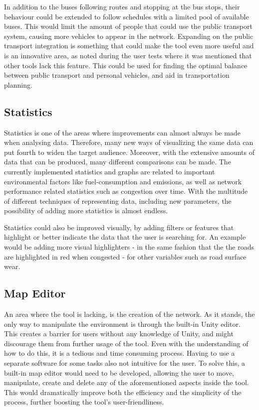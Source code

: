         In addition to the buses following routes and stopping at the bus stops, their behaviour could be extended to follow schedules with a limited pool of available buses. This would limit the amount of people that could use the public transport system, causing more vehicles to appear in the network. Expanding on the public transport integration is something that could make the tool even more useful and is an innovative area, as noted during the user tests where it was mentioned that other tools lack this feature. This could be used for finding the optimal balance between public transport and personal vehicles, and aid in transportation planning.

    \subsection{Statistics}
        Statistics is one of the areas where improvements can almost always be made when analysing data. Therefore, many new ways of visualizing the same data can put fourth to widen the target audience. Moreover, with the extensive amounts of data that can be produced, many different comparisons can be made. The currently implemented statistics and graphs are related to important environmental factors like fuel-consumption and emissions, as well as network performance related statistics such as congestion over time. With the multitude of different techniques of representing data, including new parameters, the possibility of adding more statistics is almost endless.

        Statistics could also be improved visually, by adding filters or features that highlight or better indicate the data that the user is searching for. An example would be adding more visual highlighters - in the same fashion that the the roads are highlighted in red when congested - for other variables such as road surface wear.

    \subsection{Map Editor}
        An area where the tool is lacking, is the creation of the network. As it stands, the only way to manipulate the environment is through the built-in Unity editor. This creates a barrier for users without any knowledge of Unity, and might discourage them from further usage of the tool. Even with the understanding of how to do this, it is a tedious and time consuming process. Having to use a separate software for some tasks also not intuitive for the user. To solve this, a built-in map editor would need to be developed, allowing the user to move, manipulate, create and delete any of the aforementioned aspects inside the tool. This would dramatically improve both the efficiency and the simplicity of the process, further boosting the tool's user-friendliness.